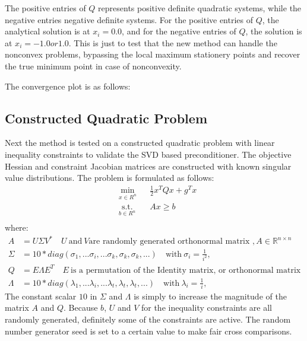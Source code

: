 \documentclass{article}
\theoremstyle{definition}
\begin{document}
The positive entries of $Q$ represents positive definite quadratic systems, while the negative entries negative definite systems. For the positive entries of $Q$, the analytical solution is at $x_i = 0.0$, and for the negative entries of $Q$, the solution is at $x_i = -1.0 or 1.0$. This is just to test that the new method can handle the nonconvex problems, bypassing the local maximum stationery points and recover the true minimum point in case of nonconvexity. 

The convergence plot is as follows:


\subsection{Constructed Quadratic Problem}
Next the method is tested on a constructed quadratic problem with linear inequality constraints to validate the SVD based preconditioner. The objective Hessian and constraint Jacobian matrices are constructed with known singular value distributions. The problem is formulated as follows:
\begin{equation*}
\begin{aligned}
&\underset{x \in R^n} {\text{min}}  
& & \frac{1}{2}x^T Q x + g^T x \\
&\underset{b \in R^n} {\text{s.t.}}  & & Ax \geq b  \\
\end{aligned}
\end{equation*}
where: 
\begin{equation*}
\begin{aligned}
A &= U \Sigma V^\ast  \quad U \ \text{and} \ V \textrm{are randomly generated orthonormal matrix }, A \in \mathbb{R}^{n\times n} \\ 
\Sigma &= 10*diag(\sigma_1, ... \sigma_i, ... \sigma_k, \sigma_k, \sigma_k, ... ) \quad \textrm{with} \ \sigma_i = \frac{1}{i^2},\\
Q &= E\Lambda E^T  \quad  E \ \textrm{is a permutation of the Identity matrix, or orthonormal matrix} \\
\Lambda &= 10*diag(\lambda_1, ...\lambda_i, ...\lambda_t, \lambda_t, \lambda_t, ...) \quad \textrm{with} \ \lambda_i = \frac{1}{i}, 
\end{aligned}
\end{equation*}
The constant scalar $10$ in $\Sigma$ and $\Lambda$ is simply to increase the magnitude of the matrix $A$ and $Q$.  
Because $b$, $U$ and $V$ for the inequality constraints are all randomly generated, definitely some of the constraints are active. The random number generator seed is set to a certain value to make fair cross comparisons. 
\end{document}

